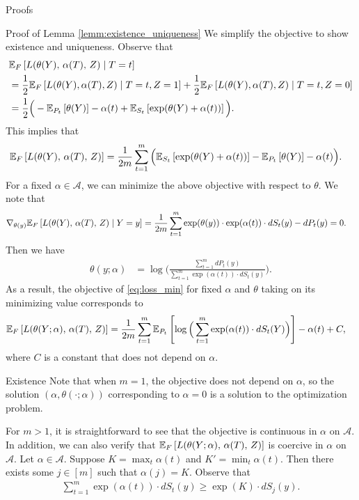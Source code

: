 \documentclass{article}
\theoremstyle{definition}
\theoremstyle{plain}
\theoremstyle{remark}
\begin{document}
\begin{section}{Proofs}
\begin{subsection}{Proof of Lemma \ref{lemm:existence_uniqueness}}
We simplify the objective to show existence and uniqueness. Observe that
\begin{align*}
&\EE[F]{L(\theta(Y),\, \alpha(T),\, Z) \mid T=t} \\
&= \frac{1}{2} \EE[F]{L(\theta(Y), \alpha(T), Z) \mid T=t, Z=1} + \frac{1}{2} \EE[F]{L(\theta(Y), \alpha(T), Z) \mid T=t, Z=0} \\
&= \frac{1}{2} \Big( -\EE[P_{t}]{\theta(Y)} - \alpha(t) + \EE[S_{t}]{\exp(\theta(Y)+ \alpha(t))} \Big).
\end{align*}
This implies that
\begin{align*}
\EE[F]{L(\theta(Y),\, \alpha(T),\, Z)} &= \frac{1}{2m} \sum_{t=1}^{m} \Big(\EE[S_{t}]{\exp(\theta(Y)+ \alpha(t))} -\EE[P_{t}]{\theta(Y)} - \alpha(t)  \Big).
\end{align*}
For a fixed $\alpha \in \mathcal{A}$, we can minimize the above objective with respect to $\theta$. We note that
\begin{align*}
\nabla_{\theta(y)} \EE[F]{L(\theta(Y),\, \alpha(T),\, Z) \mid Y=y} &= \frac{1}{2m} \sum_{t=1}^{m} \exp(\theta(y)) \cdot \exp( \alpha(t)) \cdot dS_{t}(y) - dP_{t}(y) = 0.
\end{align*}
Then we have 
\begin{align*}
\theta(y; \alpha) &= \log\Big( \frac{\sum_{t=1}^{m} dP_{t}(y)}{ \sum_{t=1}^{m} \exp(\alpha(t)) \cdot dS_{t}(y)} \Big).
\end{align*}
As a result, the objective of \eqref{eq:loss_min} for fixed $\alpha$ and $\theta$ taking on its minimizing value corresponds to
\begin{align*}
\EE[F]{L(\theta(Y; \alpha),\, \alpha(T),\, Z)} &= \frac{1}{2m} \sum_{t=1}^{m} \EE[P_{t}]{\log\Big(\sum_{t=1}^{m} \exp(\alpha(t)) \cdot dS_{t}(Y) \Big)} - \alpha(t) + C,
\end{align*}
where $C$ is a constant that does not depend on $\alpha$.

\begin{subsubsection}{Existence}
Note that when $m=1$, the objective does not depend on $\alpha$, so the solution $(\alpha, \theta(\cdot; \alpha))$ corresponding to $\alpha=0$ is a solution to the optimization problem. 

For $m > 1$, it is straightforward to see that the objective is continuous in $\alpha$ on $\mathcal{A}$. In addition, we can also verify that $\EE[F]{L(\theta(Y; \alpha),\, \alpha(T),\, Z)}$ is coercive in $\alpha$ on $\mathcal{A}$. Let $\alpha \in \mathcal{A}$. Suppose $K = \max_{t} \alpha(t)$ and $K' = \min_{t} \alpha(t)$. Then there exists some $j \in [m]$ such that $\alpha(j) = K.$ Observe that
\begin{align*}
\sum_{t=1}^{m} \exp(\alpha(t)) \cdot dS_{t}(y) \geq \exp(K) \cdot dS_{j}(y).
\end{align*}


\end{subsubsection}
\end{subsection}
\end{section}
\end{document}
